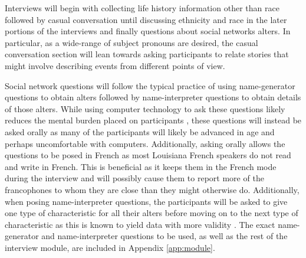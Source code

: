     Interviews will begin with collecting life history information other than race followed by casual conversation until discussing ethnicity and race in the later portions of the interviews and finally questions about social networks alters.
    In particular, as a wide-range of subject pronouns are desired, the casual conversation section will lean towards asking participants to relate stories that might involve describing events from different points of view.

    Social network questions will follow the typical practice of using name-generator questions to obtain alters followed by name-interpreter questions to obtain details of those alters.
    While using computer technology to ask these questions likely reduces the mental burden placed on participants \parencite[Stark \& Krosnick, 2017, as cited in][pp.~248-249]{vannette_collecting_2018}, these questions will instead be asked orally as many of the participants will likely be advanced in age and perhaps uncomfortable with computers.
    Additionally, asking orally allows the questions to be posed in French as most Louisiana French speakers do not read and write in French.
    This is beneficial as it keeps them in the French mode during the interview and will possibly cause them to report more of the francophones to whom they are close than they might otherwise do.
    Additionally, when posing name-interpreter questions, the participants will be asked to give one type of characteristic for all their alters before moving on to the next type of characteristic as this is known to yield data with more validity \parencite[Coromina \& Coenders, 2006; Vehovar et al., 2008, both as cited in][p.~247]{vannette_collecting_2018}.
    The exact name-generator and name-interpreter questions to be used, as well as the rest of the interview module, are included in Appendix \ref{app:module}.

